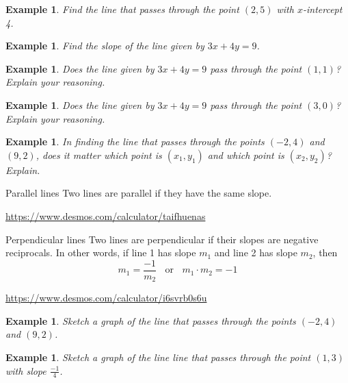 \documentclass[twoside]{tufte-handout}
\newcounter{ekcounter}%
\theoremstyle{ekimcustom}
\newtheorem{exm}[ekcounter]{Example}
\begin{document}
\begin{exm}{}
Find the line that passes through the point $(2,5)$ with $x$-intercept 4.
\end{exm}\vskip10pt

\begin{exm}{}
Find the slope of the line given by $3x+4y=9$. 
\end{exm}\vskip10pt

\begin{exm}{}
Does the line given by $3x+4y=9$ pass through the point $(1,1)$? Explain your reasoning.
\end{exm}\vskip10pt

\begin{exm}{}
Does the line given by $3x+4y=9$ pass through the point $(3,0)$? Explain your reasoning.
\end{exm}\vskip10pt

\begin{exm}{}
In finding the line that passes through the points $(-2,4)$ and $(9,2)$, does it matter which point is $(x_1,y_1)$ and which point is $(x_2,y_2)$? Explain.
\end{exm}\vskip10pt


\begin{bfact}{Parallel lines}{}
Two lines are parallel if they have the same slope. 
\end{bfact}
\hskip10pt
\url{https://www.desmos.com/calculator/taifhuenas}

\begin{bfact}{Perpendicular lines}{}
 Two lines are perpendicular if their slopes are negative reciprocals. In other words, if line 1 has slope $m_1$ and line 2 has slope $m_2$, then $$m_1=\frac{-1}{m_2}~~~~ \mbox{or}~~~~ m_1\cdot m_2=-1$$ 
\end{bfact}
\hskip10pt
\url{https://www.desmos.com/calculator/i6svrb0s6u}


\everymath{\displaystyle}
\begin{exm}{}Sketch a graph of the line that passes through the points $(-2,4)$ and $(9,2)$.
\end{exm}\vskip10pt

\begin{exm}{}Sketch a graph of the line line that passes through the point $(1,3)$ with slope $\frac{-1}{4}$. 
\end{exm}\vskip10pt
\end{document}
